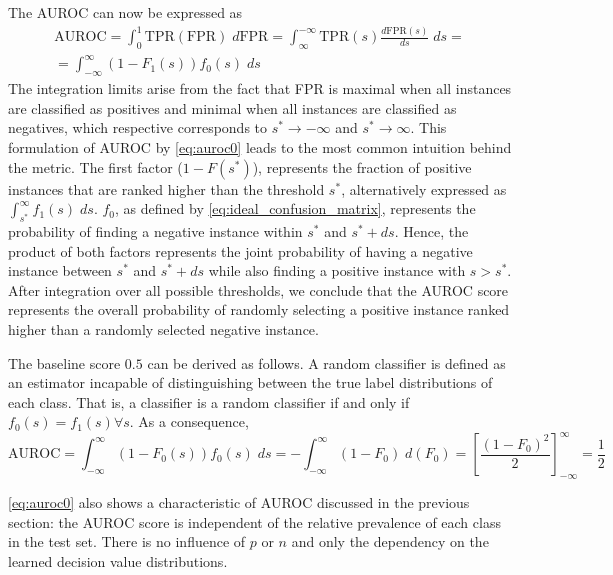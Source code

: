The AUROC can now be expressed as
%
\begin{multline}
    \text{AUROC}
    = \int_{0}^{1} \text{TPR}(\text{FPR}) \;d\text{FPR}
    = \int_{\infty}^{-\infty} \text{TPR}(s) \frac{d\text{FPR}(s)}{ds} \;ds
    =\\
    = \int_{-\infty}^{\infty} (1 - F_1(s)) f_0(s) \;ds
    \label{eq:auroc0}
\end{multline}
%
The integration limits arise from the fact that FPR is maximal when all instances are classified as positives
and minimal when all instances are classified as negatives, which respective corresponds to $s^* \to -\infty$ and $s^* \to \infty$. This formulation of AUROC by \autoref{eq:auroc0} leads to the most common intuition behind the metric.
%
The first factor ($1- F(s^*)$), represents the fraction of positive instances that are ranked higher than the threshold $s^*$, alternatively expressed as $\int_{s^*}^{\infty}f_1(s)\; ds$. $f_0$, as defined by \autoref{eq:ideal_confusion_matrix}, represents the probability of finding a negative instance within $s^*$ and $s^* + ds$. Hence, the product of both factors represents the joint probability of having a negative instance between $s^*$ and $s^* + ds$ while also finding a positive instance with $s > s^\ast$. 
%
After integration over all possible thresholds, we conclude that the AUROC score represents the overall probability of randomly selecting a positive instance ranked higher than a randomly selected negative instance.

The baseline score $0.5$ can be derived as follows. A random classifier is defined as an estimator incapable of distinguishing between the true label distributions of each class. That is, a classifier is a random classifier if and only if $f_0(s) = f_1(s) \forall s$. As a consequence,
%
\begin{equation}
    \text{AUROC}
    = \int_{-\infty}^{\infty} (1 - F_0(s)) f_0(s) \;ds
    = -\int_{-\infty}^{\infty} (1 - F_0) \;d(F_0)
    = \left[\frac{(1-F_0)^2}{2}\right]_{-\infty}^{\infty}
    = \frac{1}{2}
    \label{eq:auroc_random}
\end{equation}
 
\autoref{eq:auroc0} also shows a characteristic of AUROC discussed in the previous section: the AUROC score is independent of the relative prevalence of each class in the test set. There is no influence of $p$ or $n$ and only the dependency on the learned decision value distributions.
%

